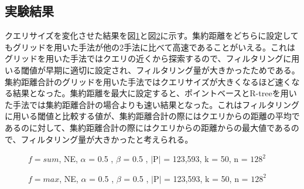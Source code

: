 \documentclass{deimj}
\theoremstyle{definition}
\begin{document}
\subsection{実験結果}

クエリサイズを変化させた結果を図\ref{fig:sum-querySize}と図\ref{fig:max-querySize}に示す。集約距離をどちらに設定してもグリッドを用いた手法が他の2手法に比べて高速であることがいえる。これはグリッドを用いた手法ではクエリの近くから探索するので、フィルタリングに用いる閾値が早期に適切に設定され、フィルタリング量が大きかったためである。集約距離合計のグリッドを用いた手法ではクエリサイズが大きくなるほど速くなる結果となった。集約距離を最大に設定すると、ポイントベースとR-treeを用いた手法では集約距離合計の場合よりも速い結果となった。これはフィルタリングに用いる閾値と比較する値が、集約距離合計の際にはクエリからの距離の平均であるのに対して、集約距離合計の際にはクエリからの距離からの最大値であるので、フィルタリング量が大きかったと考えられる。

\begin{figure}[H]
	\centering
    \caption{$f=sum$, NE, $\alpha$ = 0.5 , $\beta$ = 0.5 , $\mid$P$\mid$ = 123,593, k = 50, n = $128^2$}
    \label{fig:sum-querySize}
\end{figure}

\begin{figure}[H]
	\centering
    \caption{$f=max$, NE, $\alpha$ = 0.5 , $\beta$ = 0.5 , $\mid$P$\mid$ = 123,593, k = 50, n = $128^2$}
    \label{fig:max-querySize}
\end{figure}
\end{document}
